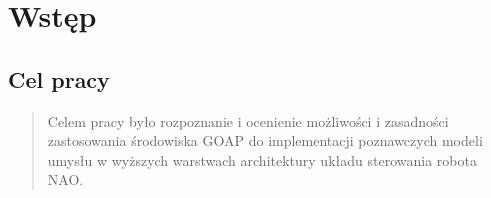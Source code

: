 {
\chapter{Wstęp}

\section{Cel pracy}

\begin{quote}
Celem pracy było rozpoznanie i ocenienie możliwości i zasadności zastosowania środowiska GOAP do implementacji poznawczych modeli umysłu w wyższych warstwach architektury układu sterowania robota NAO. 
\end{quote}



}